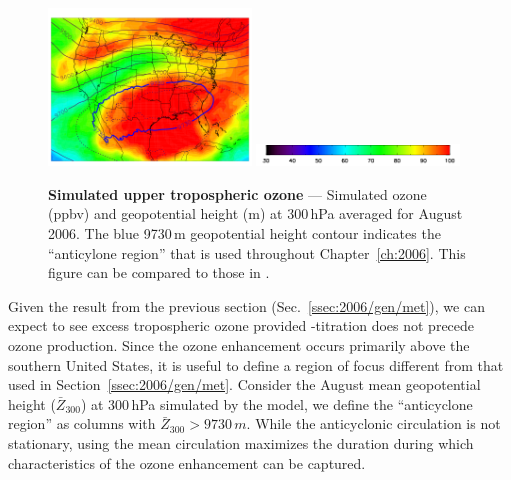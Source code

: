 	\begin{figure}
		\centering
		\begin{singlespacing}
		\vspace{-.35in}
		\includegraphics[width=0.48\textwidth]{o3/o308_300hPa}
		\includegraphics[width=0.48\textwidth]{o3/o3_colorbar}
		\caption[Simulated August ozone at 300\,\unit{hPa}]{{\small\textbf{Simulated upper tropospheric ozone} --- Simulated ozone
		(\unit{ppbv}) and geopotential height (\unit{m}) at 300\,\unit{hPa} averaged for August 2006. The blue 9730\,\unit{m} geopotential
		height contour indicates the ``anticylone region'' that is used throughout Chapter~\ref{ch:2006}. This figure can be compared
		to those in \citet{Cooper:2007cr}.}}
		\label{fig:2006/o3_300}
		\end{singlespacing}
	\end{figure}

Given the result from the previous section (Sec.~\ref{ssec:2006/gen/met}), we can expect to see excess tropospheric ozone provided
-titration does not precede ozone production. Since the ozone enhancement occurs primarily above the southern
United States, it is useful to define a region of focus different from that used in Section~\ref{ssec:2006/gen/met}. Consider the
August mean geopotential height ($\bar{Z}_{300}$) at 300\,\unit{hPa} simulated by the model, we define the ``anticyclone region'' as
columns with $\bar{Z}_{300}>9730\,\unit{m}$. While the anticyclonic circulation is not stationary, using the mean circulation maximizes
the duration during which characteristics of the ozone enhancement can be captured.

